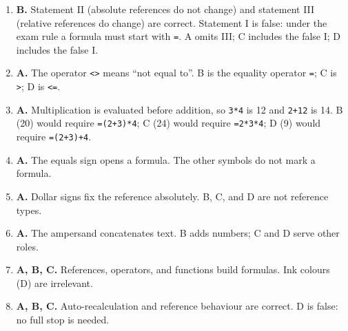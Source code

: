 \documentclass[11pt]{article}
\begin{document}
\begin{enumerate}[label=\textbf{Q\arabic*.}, leftmargin=*]
  both; C swaps the two; D wrongly says \texttt{\$A\$1} locks only the row.
\item \textbf{B.} Statement II (absolute references do not change) and
  statement III (relative references do change) are correct. Statement I is
  false: under the exam rule a formula must start with \texttt{=}. A omits III;
  C includes the false I; D includes the false I.
\item \textbf{A.} The operator \texttt{<>} means ``not equal to''. B is the
  equality operator \texttt{=}; C is \texttt{>}; D is \texttt{<=}.
\item \textbf{A.} Multiplication is evaluated before addition, so
  \texttt{3*4} is 12 and \texttt{2+12} is 14. B (20) would require
  \texttt{=(2+3)*4}; C (24) would require \texttt{=2*3*4}; D (9) would require
  \texttt{=(2+3)+4}.

\item \textbf{A.} The equals sign opens a formula. The other symbols do not mark a formula.
\item \textbf{A.} Dollar signs fix the reference absolutely. B, C, and D are not reference types.
\item \textbf{A.} The ampersand concatenates text. B adds numbers; C and D serve other roles.
\item \textbf{A, B, C.} References, operators, and functions build formulas. Ink colours (D) are irrelevant.
\item \textbf{A, B, C.} Auto-recalculation and reference behaviour are correct. D is false: no full stop is needed.
\end{enumerate}
\def\JKSSBLessonID{25}\def\JKSSBAnswers{1}
\end{document}
